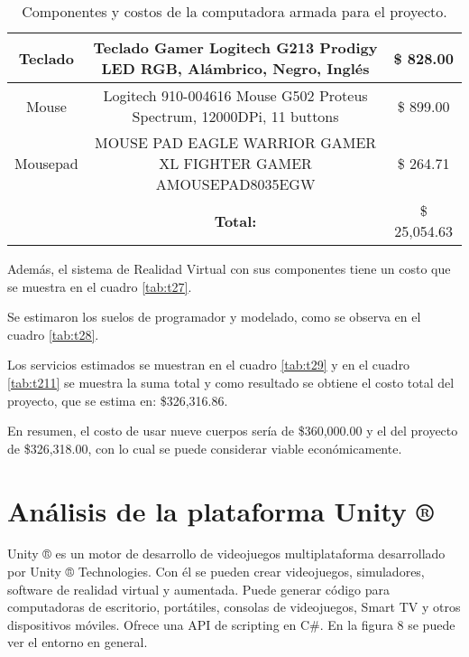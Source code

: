 \begin{table}[]
\begin{tabular}{c|c|c|}
\multicolumn{1}{|c|}{Teclado}                                   & {\color[HTML]{000000} Teclado Gamer Logitech G213 Prodigy LED RGB, Alámbrico, Negro, Inglés}                                                               & \$ 828.00       \\ \hline
\multicolumn{1}{|c|}{Mouse}                                     & {\color[HTML]{000000} Logitech 910-004616 Mouse G502 Proteus Spectrum, 12000DPi, 11 buttons}                                                               & \$ 899.00       \\ \hline
\multicolumn{1}{|c|}{Mousepad}                                  & {\color[HTML]{000000} MOUSE PAD EAGLE WARRIOR GAMER XL FIGHTER GAMER AMOUSEPAD8035EGW}                                                                     & \$ 264.71       \\ \hline
\multicolumn{1}{l|}{}                                           & \textbf{Total:}                                                                                                                                            & \$ 25,054.63    \\ \cline{2-3} 
\end{tabular}
\caption{Componentes y costos de la computadora armada para el proyecto.
}
\label{tab:t26}
\end{table}

Además, el sistema de Realidad Virtual con sus componentes tiene un costo que se muestra en el cuadro \ref{tab:t27}.

Se estimaron los suelos de programador y modelado, como se observa en el cuadro \ref{tab:t28}.

Los servicios estimados se muestran en el cuadro \ref{tab:t29} y en el cuadro \ref{tab:t211} se muestra la suma total y como resultado se obtiene el costo total del proyecto, que se estima en: \$326,316.86.



En resumen, el costo de usar nueve cuerpos sería de \$360,000.00 y el del proyecto de \$326,318.00, con lo cual se puede considerar viable económicamente.

\section{Análisis de la plataforma Unity ®}
Unity ® es un motor de desarrollo de videojuegos multiplataforma desarrollado por Unity ® Technologies. Con él se pueden crear videojuegos, simuladores, software de realidad virtual y aumentada. Puede generar código para computadoras de escritorio, portátiles, consolas de videojuegos, Smart TV y otros dispositivos móviles. Ofrece una API de scripting en C\#. En la figura 8 se puede ver el entorno en general.\\
